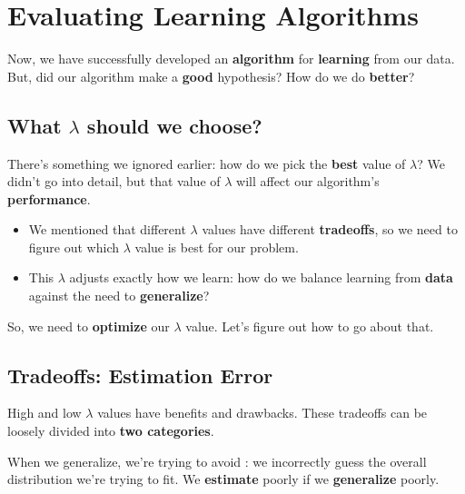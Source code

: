     
\pagebreak
        
\section{Evaluating Learning Algorithms}

    Now, we have successfully developed an \textbf{algorithm} for \textbf{learning} from our data. But, did our algorithm make a \textbf{good} hypothesis? How do we do \textbf{better}?
    
    \subsection{What $\lambda$ should we choose?}
    
        There's something we ignored earlier: how do we pick the \textbf{best} value of $\lambda$? We didn't go into detail, but that value of $\lambda$ will affect our algorithm's \textbf{performance}.
        
        \begin{itemize}
            \item We mentioned that different $\lambda$ values have different \textbf{tradeoffs}, so we need to figure out which $\lambda$ value is best for our problem.
            
            \item This $\lambda$ adjusts exactly how we learn: how do we balance learning from \textbf{data} against the need to \textbf{generalize}?
        \end{itemize}
        
        So, we need to \textbf{optimize} our $\lambda$ value. Let's figure out how to go about that.
        
    \subsection{Tradeoffs: Estimation Error}
    
        High and low $\lambda$ values have benefits and drawbacks. These tradeoffs can be loosely divided into \textbf{two categories}.
        
        When we generalize, we're trying to avoid : we incorrectly guess the overall distribution we're trying to fit. We \textbf{estimate} poorly if we \textbf{generalize} poorly.\\
        
